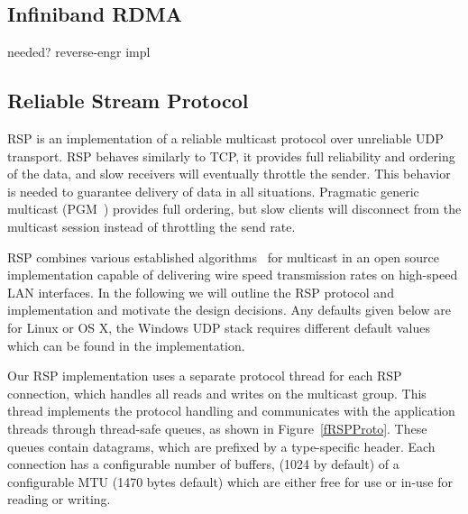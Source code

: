 \documentclass[10pt,journal,compsoc]{IEEEtran}
\newcommand{\fig}[1]{Figure~\ref{#1}}
\begin{document}
\subsection{Infiniband RDMA}

needed? reverse-engr impl

\subsection{Reliable Stream Protocol}\label{sec:RSP}

RSP is an implementation of a reliable multicast protocol over unreliable UDP
transport. RSP behaves similarly to TCP, it provides full reliability and
ordering of the data, and slow receivers will eventually throttle the
sender. This behavior is needed to guarantee delivery of data in all
situations. Pragmatic generic multicast (PGM~\cite{pgm}) provides full ordering,
but slow clients will disconnect from the multicast session instead of
throttling the send rate.

RSP combines various established algorithms~\cite{adamson2004negative,
  Gau:2002:MFC:506824.506832} for multicast in an open source implementation
capable of delivering wire speed transmission rates on high-speed LAN
interfaces. In the following we will outline the RSP protocol and implementation
and motivate the design decisions. Any defaults given below are for Linux or OS
X, the Windows UDP stack requires different default values which can be found in
the implementation.

Our RSP implementation uses a separate protocol thread for each RSP connection,
which handles all reads and writes on the multicast group. This thread
implements the protocol handling and communicates with the application threads
through thread-safe queues, as shown in \fig{fRSPProto}. These queues contain
datagrams, which are prefixed by a type-specific header. Each connection has a
configurable number of buffers, (1024 by default) of a configurable MTU (1470
bytes default) which are either free for use or in-use for reading or writing.


\end{document}
